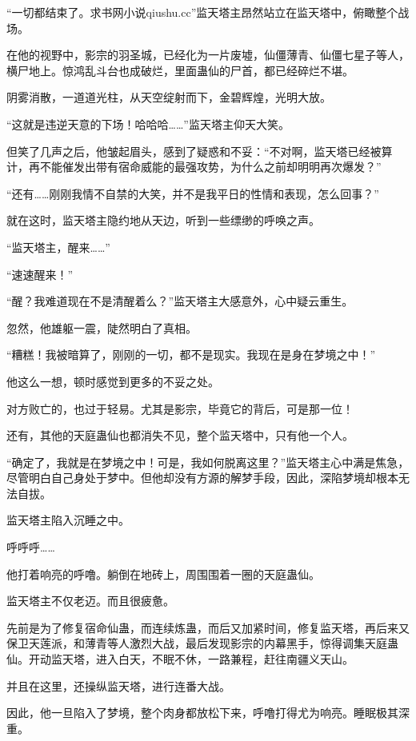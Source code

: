
\begin{this_body}

“一切都结束了。求书网小说qiushu.cc”监天塔主昂然站立在监天塔中，俯瞰整个战场。

在他的视野中，影宗的羽圣城，已经化为一片废墟，仙僵薄青、仙僵七星子等人，横尸地上。惊鸿乱斗台也成破烂，里面蛊仙的尸首，都已经碎烂不堪。

阴雾消散，一道道光柱，从天空绽射而下，金碧辉煌，光明大放。

“这就是违逆天意的下场！哈哈哈……”监天塔主仰天大笑。

但笑了几声之后，他皱起眉头，感到了疑惑和不妥：“不对啊，监天塔已经被算计，再不能催发出带有宿命威能的最强攻势，为什么之前却明明再次爆发？”

“还有……刚刚我情不自禁的大笑，并不是我平日的性情和表现，怎么回事？”

就在这时，监天塔主隐约地从天边，听到一些缥缈的呼唤之声。

“监天塔主，醒来……”

“速速醒来！”

“醒？我难道现在不是清醒着么？”监天塔主大感意外，心中疑云重生。

忽然，他雄躯一震，陡然明白了真相。

“糟糕！我被暗算了，刚刚的一切，都不是现实。我现在是身在梦境之中！”

他这么一想，顿时感觉到更多的不妥之处。

对方败亡的，也过于轻易。尤其是影宗，毕竟它的背后，可是那一位！

还有，其他的天庭蛊仙也都消失不见，整个监天塔中，只有他一个人。

“确定了，我就是在梦境之中！可是，我如何脱离这里？”监天塔主心中满是焦急，尽管明白自己身处于梦中。但他却没有方源的解梦手段，因此，深陷梦境却根本无法自拔。

监天塔主陷入沉睡之中。

呼呼呼……

他打着响亮的呼噜。躺倒在地砖上，周围围着一圈的天庭蛊仙。

监天塔主不仅老迈。而且很疲惫。

先前是为了修复宿命仙蛊，而连续炼蛊，而后又加紧时间，修复监天塔，再后来又保卫天莲派，和薄青等人激烈大战，最后发现影宗的内幕黑手，惊得调集天庭蛊仙。开动监天塔，进入白天，不眠不休，一路兼程，赶往南疆义天山。

并且在这里，还操纵监天塔，进行连番大战。

因此，他一旦陷入了梦境，整个肉身都放松下来，呼噜打得尤为响亮。睡眠极其深重。


\end{this_body}
